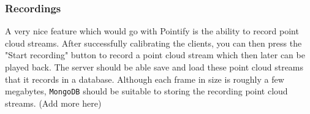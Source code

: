 \documentclass{article}
\begin{document}
\subsubsection{Recordings}
A very nice feature which would go with Pointify is the ability to record point cloud streams. After successfully calibrating the clients, you can then press the "Start recording" button to record a point cloud stream which then later can be played back. The server should be able save and load these point cloud streams that it records in a database. Although each frame in size is roughly a few megabytes, \texttt{MongoDB} should be suitable to storing the recording point cloud streams. (Add more here)

\end{document}

